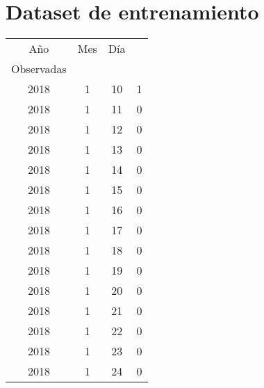 
\appendix
\chapter{Dataset de entrenamiento}
\begin{longtable} {|c|c|c|c|}
\hline
Año                      & Mes                                                                                                                                                                                                   & Día                                                 &
 \begin{tabular}[c]{@{}c@{}}Ventas\\ Observadas\end{tabular} \\     \hline
2018         & 1            & 10           & 1                         \\ 
\hline
2018         & 1            & 11           & 0                         \\ 
\hline
2018         & 1            & 12           & 0                         \\ 
\hline
2018         & 1            & 13           & 0                         \\ 
\hline
2018         & 1            & 14           & 0                         \\ 
\hline
2018         & 1            & 15           & 0                         \\ 
\hline
2018         & 1            & 16           & 0                         \\ 
\hline
2018         & 1            & 17           & 0                         \\ 
\hline
2018         & 1            & 18           & 0                         \\ 
\hline
2018         & 1            & 19           & 0                         \\ 
\hline
2018         & 1            & 20           & 0                         \\ 
\hline
2018         & 1            & 21           & 0                         \\ 
\hline
2018         & 1            & 22           & 0                         \\ 
\hline
2018         & 1            & 23           & 0                         \\ 
\hline
2018         & 1            & 24           & 0                         \\ 

\end{longtable}

